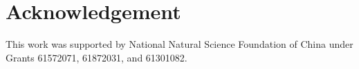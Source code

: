 \documentclass{edm_template}
\begin{document}


\section{Acknowledgement}
This work was supported by National Natural Science Foundation of China under Grants 61572071, 61872031, and 61301082.




\end{document}
